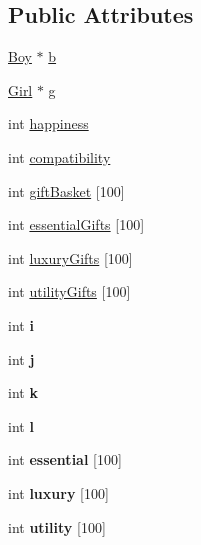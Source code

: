 \subsection*{Public Attributes}
\begin{DoxyCompactItemize}
\item 
\hyperlink{classBoy}{Boy} $\ast$ \hyperlink{classCouple_a9d9d9a29a48da4a1da8ac1f445813454}{b}
\item 
\hyperlink{classGirl}{Girl} $\ast$ \hyperlink{classCouple_a025c86ed75a8b2482fcc3e98a84c39c1}{g}
\item 
int \hyperlink{classCouple_aee78d616688f0cccff84e1c23cb31f7a}{happiness}
\item 
int \hyperlink{classCouple_af47d6ced781259303e10836182abb8c1}{compatibility}
\item 
int \hyperlink{classCouple_a2080514dd79fa3bb90695fd295c02429}{gift\+Basket} \mbox{[}100\mbox{]}
\item 
int \hyperlink{classCouple_a2d99d5e38764b95a798b7177d7d64d07}{essential\+Gifts} \mbox{[}100\mbox{]}
\item 
int \hyperlink{classCouple_a7b672637b9c901e1ffcbd27e13a7a57a}{luxury\+Gifts} \mbox{[}100\mbox{]}
\item 
int \hyperlink{classCouple_ab88c6aeb8added9e52bd824e1cacb044}{utility\+Gifts} \mbox{[}100\mbox{]}
\item 
int {\bfseries i}\hypertarget{classCouple_a28c8fce17e5e57695b5666e00d56e978}{}\label{classCouple_a28c8fce17e5e57695b5666e00d56e978}

\item 
int {\bfseries j}\hypertarget{classCouple_a523d74439d1c4a1cdd82eb6cf1bc110b}{}\label{classCouple_a523d74439d1c4a1cdd82eb6cf1bc110b}

\item 
int {\bfseries k}\hypertarget{classCouple_a5866f442fe19951d4a24a28269bde153}{}\label{classCouple_a5866f442fe19951d4a24a28269bde153}

\item 
int {\bfseries l}\hypertarget{classCouple_a8fef30ff16f98658fa0d84d56506406d}{}\label{classCouple_a8fef30ff16f98658fa0d84d56506406d}

\item 
int {\bfseries essential} \mbox{[}100\mbox{]}\hypertarget{classCouple_a7fe97ae03455efbfdcd94d231a188617}{}\label{classCouple_a7fe97ae03455efbfdcd94d231a188617}

\item 
int {\bfseries luxury} \mbox{[}100\mbox{]}\hypertarget{classCouple_ad5680b1ee607cee158d2e3e39a30a8dc}{}\label{classCouple_ad5680b1ee607cee158d2e3e39a30a8dc}

\item 
int {\bfseries utility} \mbox{[}100\mbox{]}\hypertarget{classCouple_ac52780fe9cf70da452b7ae99055ccb33}{}\label{classCouple_ac52780fe9cf70da452b7ae99055ccb33}

\end{DoxyCompactItemize}


